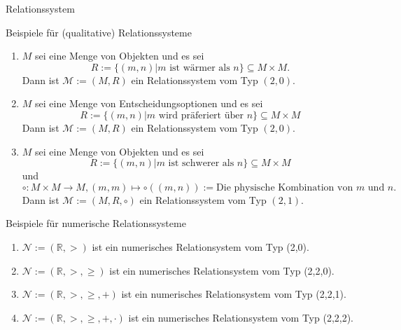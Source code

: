 \documentclass[
  8pt,
  ignorenonframetext,
]{beamer}
\providecommand{\tightlist}{%
  \setlength{\itemsep}{0pt}\setlength{\parskip}{0pt}}
\begin{document}
\begin{frame}{Relationssystem}
\protect\hypertarget{relationssystem}{}
\vspace{2mm}
\small

Beispiele für (qualitative) Relationssysteme \footnotesize

\begin{enumerate}
[(1)]
\item
  \(M\) sei eine Menge von Objekten und es sei \begin{equation}
  R := \{(m,n)| m \mbox{ ist wärmer als } n\} \subseteq  M\times M.
  \end{equation} Dann ist \(\mathcal{M} := (M,R)\) ein Relationssystem
  vom Typ \((2,0)\).
\item
  \(M\) sei eine Menge von Entscheidungsoptionen und es sei
  \begin{equation}
  R := \{(m,n)| m \mbox{ wird präferiert über } n\} \subseteq  M\times M
  \end{equation} Dann ist \(\mathcal{M} := (M,R)\) ein Relationssystem
  vom Typ \((2,0)\).
\item
  \(M\) sei eine Menge von Objekten und es sei \begin{equation}
  R := \{(m,n)| m \mbox{ ist schwerer als } n\} \subseteq  M\times M
  \end{equation} und \begin{equation}
  \circ : M \times M \to M, (m,m) \mapsto \circ((m,n)) := \mbox{Die physische Kombination von } m \mbox{ und } n.
  \end{equation} Dann ist \(\mathcal{M} := (M,R,\circ)\) ein
  Relationssystem vom Typ \((2,1)\).
\end{enumerate}

\small

Beispiele für numerische Relationssysteme \footnotesize

\begin{enumerate}
[(1)]
\tightlist
\item
  \(\mathcal{N} := (\mathbb{R},>)\) ist ein numerisches Relationsystem
  vom Typ (2,0).
\item
  \(\mathcal{N} := (\mathbb{R},>,\ge)\) ist ein numerisches
  Relationsystem vom Typ (2,2,0).
\item
  \(\mathcal{N} := (\mathbb{R},>,\ge, +)\) ist ein numerisches
  Relationsystem vom Typ (2,2,1).
\item
  \(\mathcal{N} := (\mathbb{R},>,\ge, +, \cdot)\) ist ein numerisches
  Relationsystem vom Typ (2,2,2).
\end{enumerate}
\end{frame}
\end{document}
